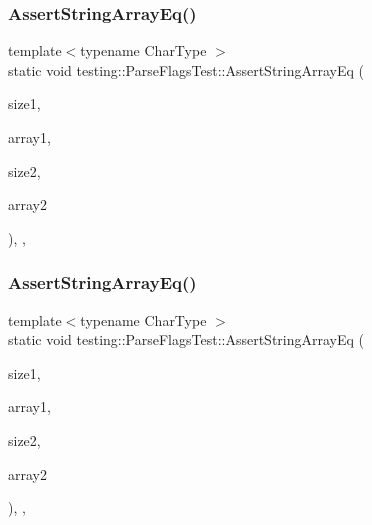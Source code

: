 \mbox{\label{classtesting_1_1_parse_flags_test_ab6e898999669ae38441ed822356a2812}} 
\subsubsection{\texorpdfstring{AssertStringArrayEq()}{AssertStringArrayEq()}\hspace{0.1cm}{\footnotesize\ttfamily [2/3]}}
{\footnotesize\ttfamily template$<$typename Char\+Type $>$ \\
static void testing\+::\+Parse\+Flags\+Test\+::\+Assert\+String\+Array\+Eq (\begin{DoxyParamCaption}\item[{int}]{size1,  }\item[{Char\+Type $\ast$$\ast$}]{array1,  }\item[{int}]{size2,  }\item[{Char\+Type $\ast$$\ast$}]{array2 }\end{DoxyParamCaption})\hspace{0.3cm}{\ttfamily [inline]}, {\ttfamily [static]}, {\ttfamily [protected]}}

\mbox{\label{classtesting_1_1_parse_flags_test_ab6e898999669ae38441ed822356a2812}} 
\subsubsection{\texorpdfstring{AssertStringArrayEq()}{AssertStringArrayEq()}\hspace{0.1cm}{\footnotesize\ttfamily [3/3]}}
{\footnotesize\ttfamily template$<$typename Char\+Type $>$ \\
static void testing\+::\+Parse\+Flags\+Test\+::\+Assert\+String\+Array\+Eq (\begin{DoxyParamCaption}\item[{int}]{size1,  }\item[{Char\+Type $\ast$$\ast$}]{array1,  }\item[{int}]{size2,  }\item[{Char\+Type $\ast$$\ast$}]{array2 }\end{DoxyParamCaption})\hspace{0.3cm}{\ttfamily [inline]}, {\ttfamily [static]}, {\ttfamily [protected]}}

